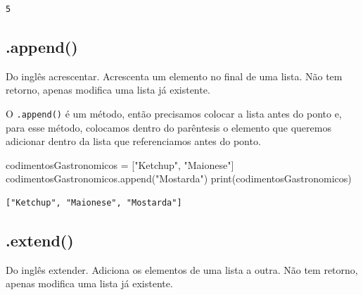 \documentclass[
  letterpaper,
  DIV=11,
  numbers=noendperiod]{scrreprt}
\newenvironment{Shaded}{\begin{snugshade}}{\end{snugshade}}
\newcommand{\BuiltInTok}[1]{\textcolor[rgb]{0.00,0.23,0.31}{#1}}
\newcommand{\NormalTok}[1]{\textcolor[rgb]{0.00,0.23,0.31}{#1}}
\newcommand{\OperatorTok}[1]{\textcolor[rgb]{0.37,0.37,0.37}{#1}}
\newcommand{\StringTok}[1]{\textcolor[rgb]{0.13,0.47,0.30}{#1}}
\begin{document}
\begin{tcolorbox}[enhanced jigsaw, breakable, leftrule=.75mm, left=2mm, opacityback=0, bottomrule=.15mm, toprule=.15mm, rightrule=.15mm, arc=.35mm, colback=white]

\begin{verbatim}
5
\end{verbatim}

\end{tcolorbox}

\hypertarget{append}{%
\subsection{.append()}\label{append}}

Do inglês acrescentar. Acrescenta um elemento no final de uma lista. Não
tem retorno, apenas modifica uma lista já existente.

O \texttt{.append()} é um método, então precisamos colocar a lista antes
do ponto e, para esse método, colocamos dentro do parêntesis o elemento
que queremos adicionar dentro da lista que referenciamos antes do ponto.

\begin{Shaded}
\begin{Highlighting}[]
\NormalTok{codimentosGastronomicos }\OperatorTok{=}\NormalTok{ [}\StringTok{"Ketchup"}\NormalTok{, }\StringTok{"Maionese"}\NormalTok{]}
\NormalTok{codimentosGastronomicos.append(}\StringTok{"Mostarda"}\NormalTok{)}
\BuiltInTok{print}\NormalTok{(codimentosGastronomicos)}
\end{Highlighting}
\end{Shaded}

\begin{tcolorbox}[enhanced jigsaw, breakable, leftrule=.75mm, left=2mm, opacityback=0, bottomrule=.15mm, toprule=.15mm, rightrule=.15mm, arc=.35mm, colback=white]

\begin{verbatim}
["Ketchup", "Maionese", "Mostarda"]
\end{verbatim}

\end{tcolorbox}

\hypertarget{extend}{%
\subsection{.extend()}\label{extend}}

Do inglês extender. Adiciona os elementos de uma lista a outra. Não tem
retorno, apenas modifica uma lista já existente.
\end{document}
